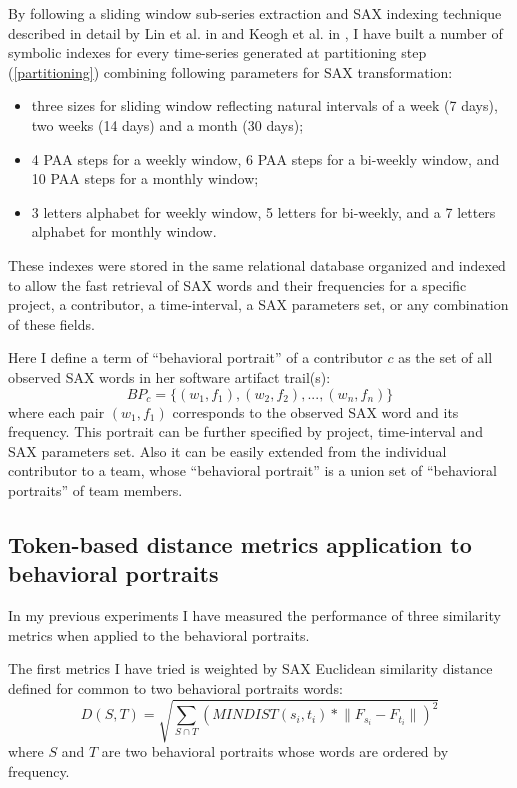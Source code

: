 \documentclass[conference]{worldcomp}
\begin{document}
By following a sliding window sub-series extraction and SAX indexing technique described 
in detail by Lin et al. in \cite{citeulike:2821475} and Keogh et al. in 
\cite{citeulike:532335}, I have built a number of symbolic indexes for every time-series 
generated at partitioning step (\ref{partitioning}) combining following parameters for 
SAX transformation: 
\begin{itemize}
 \item three sizes for sliding window reflecting natural intervals of a week (7 days), 
      two weeks (14 days) and a month (30 days);
 \item 4 PAA steps for a weekly window, 6 PAA steps for a bi-weekly window,
      and 10 PAA steps for a monthly window;
 \item 3 letters alphabet for weekly window, 5 letters for bi-weekly,
      and a 7 letters alphabet for monthly window.
\end{itemize}

These indexes were stored in the same relational database organized and indexed to allow the fast 
retrieval of SAX words and their frequencies for a specific project, 
a contributor, a time-interval, a SAX parameters set, or any combination of these fields. 

Here I define a term of ``behavioral portrait'' of a contributor $c$ as the set of all observed SAX words 
in her software artifact trail(s):
\begin{equation}
 BP_{c} = \{ (w_{1},f_{1}), (w_{2},f_{2}), ..., (w_{n},f_{n}) \}
\end{equation}
where each pair $(w_{1},f_{1})$ corresponds to the observed SAX word and its frequency. This portrait can
be further specified by project, time-interval and SAX parameters set. Also it can be easily extended 
from the individual contributor to a team, whose ``behavioral portrait'' is a union set
of ``behavioral portraits'' of team members.

\subsection{Token-based distance metrics application to behavioral portraits}
In my previous experiments I have measured the performance of three similarity metrics 
when applied to the behavioral portraits. 

The first metrics I have tried is weighted by SAX Euclidean similarity distance defined for common to two 
behavioral portraits words:
\begin{equation}
D(S,T) = \sqrt{ \sum_{S\cap T} (MINDIST(s_{i},t_{i}) * \lVert F_{s_{i}}-F_{t_{i}} \rVert )^{2}  }
\end{equation} 
where $S$ and $T$ are two behavioral portraits whose words are ordered by frequency.
\end{document}
